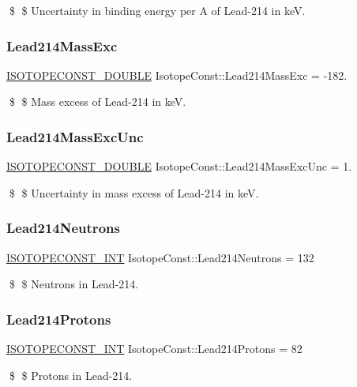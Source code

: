 \$ \$ Uncertainty in binding energy per A of Lead-\/214 in keV. \mbox{\label{group___isotope_const-_lead-_pb214_gacaab191e9175f417c224dd399c0870a9}} 
\subsubsection{\texorpdfstring{Lead214\+Mass\+Exc}{Lead214MassExc}}
{\footnotesize\ttfamily \mbox{\hyperlink{group___isotope_const-_macros_ga8f45a7272ce02c0b4c65c44636ed719a}{I\+S\+O\+T\+O\+P\+E\+C\+O\+N\+S\+T\+\_\+\+D\+O\+U\+B\+LE}} Isotope\+Const\+::\+Lead214\+Mass\+Exc = -\/182.}

\$ \$ Mass excess of Lead-\/214 in keV. \mbox{\label{group___isotope_const-_lead-_pb214_ga58c1613d8fe581007a71bc514452cdd0}} 
\subsubsection{\texorpdfstring{Lead214\+Mass\+Exc\+Unc}{Lead214MassExcUnc}}
{\footnotesize\ttfamily \mbox{\hyperlink{group___isotope_const-_macros_ga8f45a7272ce02c0b4c65c44636ed719a}{I\+S\+O\+T\+O\+P\+E\+C\+O\+N\+S\+T\+\_\+\+D\+O\+U\+B\+LE}} Isotope\+Const\+::\+Lead214\+Mass\+Exc\+Unc = 1.}

\$ \$ Uncertainty in mass excess of Lead-\/214 in keV. \mbox{\label{group___isotope_const-_lead-_pb214_gaf936a121f9df15243577a284d18eb330}} 
\subsubsection{\texorpdfstring{Lead214\+Neutrons}{Lead214Neutrons}}
{\footnotesize\ttfamily \mbox{\hyperlink{group___isotope_const-_macros_ga5f18360b3e99483a35c32d789e62621c}{I\+S\+O\+T\+O\+P\+E\+C\+O\+N\+S\+T\+\_\+\+I\+NT}} Isotope\+Const\+::\+Lead214\+Neutrons = 132}

\$ \$ Neutrons in Lead-\/214. \mbox{\label{group___isotope_const-_lead-_pb214_gab334c69c02bcd336c63fddbfc017d339}} 
\subsubsection{\texorpdfstring{Lead214\+Protons}{Lead214Protons}}
{\footnotesize\ttfamily \mbox{\hyperlink{group___isotope_const-_macros_ga5f18360b3e99483a35c32d789e62621c}{I\+S\+O\+T\+O\+P\+E\+C\+O\+N\+S\+T\+\_\+\+I\+NT}} Isotope\+Const\+::\+Lead214\+Protons = 82}

\$ \$ Protons in Lead-\/214. 